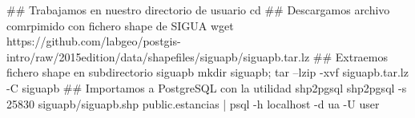\lstset{caption=Importación de estancias,label=bash:importarEstancias}
\begin{bash}
## Trabajamos en nuestro directorio de usuario
cd
## Descargamos archivo comrpimido con fichero shape de SIGUA
wget https://github.com/labgeo/postgis-intro/raw/2015edition/data/shapefiles/siguapb/siguapb.tar.lz
## Extraemos fichero shape en subdirectorio siguapb
mkdir siguapb; tar --lzip -xvf siguapb.tar.lz -C siguapb
## Importamos a PostgreSQL con la utilidad shp2pgsql
shp2pgsql -s 25830 siguapb/siguapb.shp public.estancias  | psql -h localhost -d ua -U user
\end{bash}
